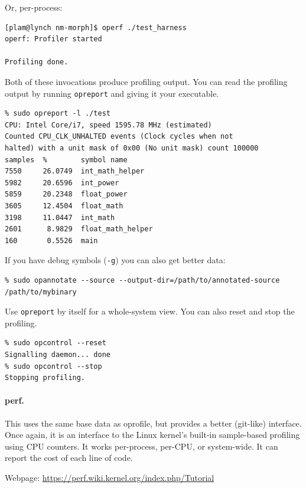 \documentclass[a4paper]{report}
\begin{document}
Or, per-process:
\begin{lstlisting}
[plam@lynch nm-morph]$ operf ./test_harness
operf: Profiler started

Profiling done.
\end{lstlisting}%

Both of these invocations produce profiling output. You can read the profiling output
by running {\tt opreport} and giving it your executable.

  \begin{lstlisting}
% sudo opreport -l ./test    
CPU: Intel Core/i7, speed 1595.78 MHz (estimated)
Counted CPU_CLK_UNHALTED events (Clock cycles when not
halted) with a unit mask of 0x00 (No unit mask) count 100000
samples  %        symbol name
7550     26.0749  int_math_helper
5982     20.6596  int_power
5859     20.2348  float_power
3605     12.4504  float_math
3198     11.0447  int_math
2601      8.9829  float_math_helper
160       0.5526  main
  \end{lstlisting}
  If you have debug symbols ({\tt -g}) you can also get better data:
  {\small
  \begin{lstlisting}
% sudo opannotate --source --output-dir=/path/to/annotated-source /path/to/mybinary
  \end{lstlisting}
  }

Use {\tt opreport} by itself for a whole-system view.
    You can also reset and stop the profiling.
  \begin{lstlisting}
% sudo opcontrol --reset 
Signalling daemon... done
% sudo opcontrol --stop
Stopping profiling.
  \end{lstlisting}

\paragraph{perf.} This uses the same base data as oprofile, but provides a better
(git-like) interface. Once again, it is an interface to the Linux kernel's built-in
sample-based profiling using CPU counters. It works per-process, per-CPU, or system-wide.
It can report the cost of each line of code.

Webpage: \url{https://perf.wiki.kernel.org/index.php/Tutorial}
\end{document}
